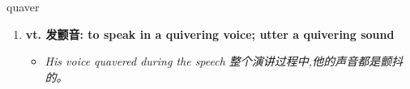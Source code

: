 
\begin{frame}
{\huge quaver}
\begin{center}
\begin{enumerate}\Large
  \item \textbf{vt. 发颤音: to speak in a quivering voice; utter a quivering sound}
  \begin{itemize}
    \item \em{\Large{His voice quavered during the speech 整个演讲过程中,他的声音都是颤抖的。}}
  \end{itemize}
\end{enumerate}
\end{center}
\end{frame}
